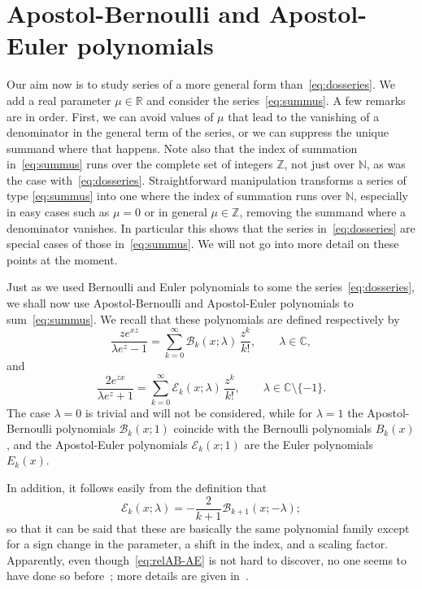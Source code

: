 \documentclass[11pt, oneside]{article}
\newcommand{\N}{\mathbb{N}}
\newcommand{\Z}{\mathbb{Z}}
\newcommand{\R}{\mathbb{R}}
\newcommand{\C}{\mathbb{C}}
\newcommand{\calB}{\mathcal{B}}
\newcommand{\calE}{\mathcal{E}}
\theoremstyle{plain}
\theoremstyle{definition}
\begin{document}
\section{Apostol-Bernoulli and Apostol-Euler polynomials}
\label{sec:ABAEsin}

Our aim now is to study series of a more general form than~\eqref{eq:dosseries}. We add a real parameter $\mu \in \R$ and consider the series~\eqref{eq:summus}.  
A few remarks are in order. First, we can avoid values of $\mu$ that lead to the vanishing of a denominator in the general term of the series, or we can suppress the unique summand where that happens.
Note also that the index of summation in~\eqref{eq:summus} runs over the complete set of integers $\Z$, not just over $\N$, as was the case with~\eqref{eq:dosseries}. Straightforward manipulation transforms a series of type \eqref{eq:summus} into one where the index of summation runs over $\N$, especially in easy cases such as $\mu = 0$ or in general $\mu \in \Z$, removing the summand where a denominator vanishes. In particular this shows that the series in~\eqref{eq:dosseries} are special cases of those in~\eqref{eq:summus}. We will not go into more detail on these points at the moment. 

Just as we used Bernoulli and Euler polynomials to some the series~\eqref{eq:dosseries}, we shall now use Apostol-Bernoulli and Apostol-Euler polynomials to sum~\eqref{eq:summus}.
We recall that these polynomials are defined respectively by
\begin{equation*}
  \frac{z e^{xz}}{\lambda e^z-1} 
  = \sum_{k=0}^\infty \calB_k(x;\lambda)\, \frac{z^k}{k!},
  \qquad \lambda \in \C,
\end{equation*}
and
\begin{equation}
\label{eq:GF-AE}
  \frac{2 e^{zx}}{\lambda e^z+1}
  = \sum_{k=0}^\infty \calE_k(x;\lambda)\, \frac{z^k}{k!},
  \qquad \lambda \in \C \setminus \{-1\}.
\end{equation}
The case $\lambda=0$ is trivial and will not be considered, while for $\lambda=1$ the Apostol-Bernoulli polynomials $\calB_k(x;1)$ coincide with the Bernoulli polynomials $B_k(x)$, and the Apostol-Euler polynomials $\calE_k(x;1)$ are the Euler polynomials $E_k(x)$.

In addition, it follows easily from the definition that
\begin{equation}
\label{eq:relAB-AE}
  \calE_{k}(x;\lambda) = - \frac{2}{k+1} \calB_{k+1}(x;-\lambda);
\end{equation}
so that it can be said that these are basically the same polynomial family except for a sign change in the parameter, a shift in the index, and a scaling factor. Apparently, even though~\eqref{eq:relAB-AE} is not hard to discover, no one seems to have done so before~\cite{NRV}; more details are given in~\cite{NRV-Brno}.
\end{document}
